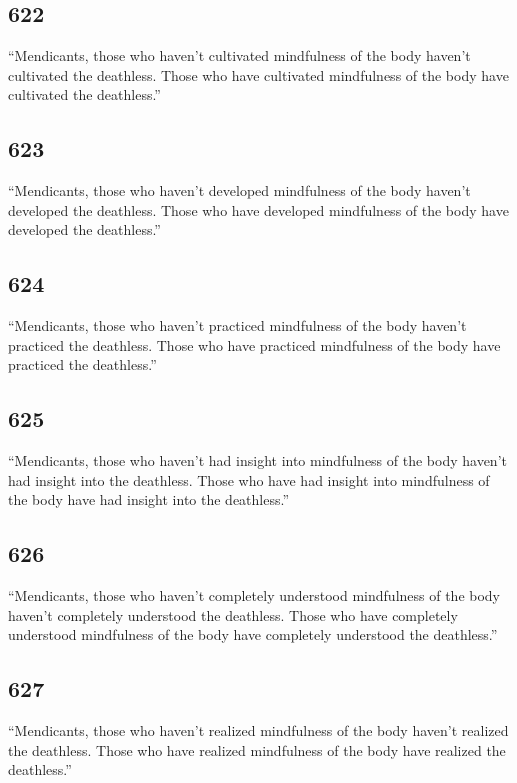 \documentclass[12pt,openany]{book}%
\begin{document}
\subsection*{622 }

“Mendicants, those who haven’t cultivated mindfulness of the body haven’t cultivated the deathless. Those who have cultivated mindfulness of the body have cultivated the deathless.” 

\subsection*{623 }

“Mendicants, those who haven’t developed mindfulness of the body haven’t developed the deathless. Those who have developed mindfulness of the body have developed the deathless.” 

\subsection*{624 }

“Mendicants, those who haven’t practiced mindfulness of the body haven’t practiced the deathless. Those who have practiced mindfulness of the body have practiced the deathless.” 

\subsection*{625 }

“Mendicants, those who haven’t had insight into mindfulness of the body haven’t had insight into the deathless. Those who have had insight into mindfulness of the body have had insight into the deathless.” 

\subsection*{626 }

“Mendicants, those who haven’t completely understood mindfulness of the body haven’t completely understood the deathless. Those who have completely understood mindfulness of the body have completely understood the deathless.” 

\subsection*{627 }

“Mendicants, those who haven’t realized mindfulness of the body haven’t realized the deathless. Those who have realized mindfulness of the body have realized the deathless.” 
\end{document}
